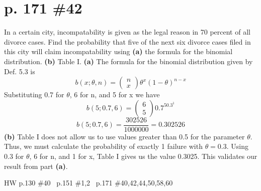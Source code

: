 \documentclass[12pt]{article}
\begin{document}
	\section[20pt]{p. 171 \#42}
	In a certain city, incompatability is given as the legal reason in 70 percent of all divorce cases. Find the probability that five of the next six divorce cases filed in this city will claim incompatability using \newline
	\textbf{(a)} the formula for the binomial distribution. \newline
	\textbf{(b)} Table I.
	\newline
	\newline
	\textbf{(a)} The formula for the binomial distribution given by Def. 5.3 is
	\[b(x;
	\theta,n)=\left(\begin{array}{ccc}
	n \\ x
	\end{array}\right)\theta^x(1-\theta)^{n-x}\]
	Substituting 0.7 for \(\theta\), 6 for n, and 5 for x we have
	\[b(5;0.7,6)=\left(\begin{array}{ccc}
	6 \\ 5
	\end{array}\right)0.7^50.3^1\]
	\[b(5;0.7,6)=\frac{302526}{1000000}=0.302526\]
	\newline
	\newline
	\textbf{(b)} Table I does not allow us to use values greater than 0.5 for the parameter \(\theta\). Thus, we must calculate the probability of exactly 1 failure with \(\theta=0.3\). \newline
	Using 0.3 for \(\theta\), 6 for n, and 1 for x, Table I gives us the value 0.3025. \newline
	\newline
	This validates our result from part \textbf{(a)}.
	\newpage
	\maketitle HW p.130 \#40 \ p.151 \#1,2 \ p.171 \#40,42,44,50,58,60
\end{document}
